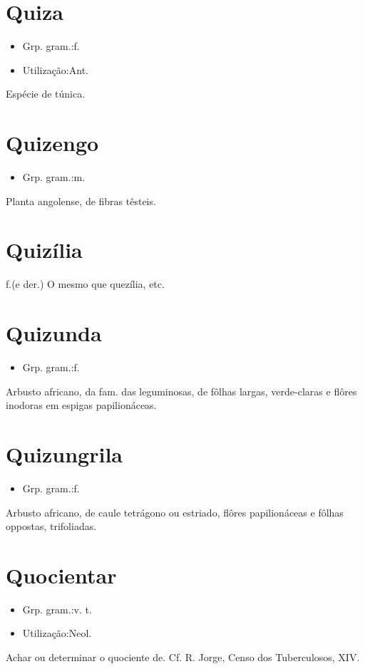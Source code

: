 \section{Quiza}
\begin{itemize}
\item {Grp. gram.:f.}
\end{itemize}
\begin{itemize}
\item {Utilização:Ant.}
\end{itemize}
Espécie de túnica.
\section{Quizengo}
\begin{itemize}
\item {Grp. gram.:m.}
\end{itemize}
Planta angolense, de fibras têsteis.
\section{Quizília}
\textunderscore f.\textunderscore  (e der.)
O mesmo que \textunderscore quezília\textunderscore , etc.
\section{Quizunda}
\begin{itemize}
\item {Grp. gram.:f.}
\end{itemize}
Arbusto africano, da fam. das leguminosas, de fôlhas largas, verde-claras e flôres inodoras em espigas papilionáceas.
\section{Quizungrila}
\begin{itemize}
\item {Grp. gram.:f.}
\end{itemize}
Arbusto africano, de caule tetrágono ou estriado, flôres papilionáceas e fôlhas oppostas, trifoliadas.
\section{Quocientar}
\begin{itemize}
\item {Grp. gram.:v. t.}
\end{itemize}
\begin{itemize}
\item {Utilização:Neol.}
\end{itemize}
Achar ou determinar o quociente de. Cf. R. Jorge, \textunderscore Censo dos Tuberculosos\textunderscore , XIV.
